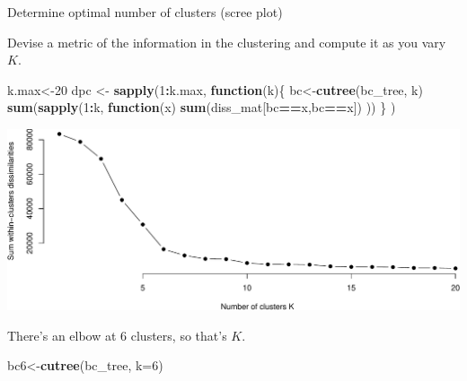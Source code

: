 \documentclass[
  ignorenonframetext,
]{beamer}
\newenvironment{Shaded}{\begin{snugshade}}{\end{snugshade}}
\newcommand{\ControlFlowTok}[1]{\textcolor[rgb]{0.13,0.29,0.53}{\textbf{#1}}}
\newcommand{\DataTypeTok}[1]{\textcolor[rgb]{0.13,0.29,0.53}{#1}}
\newcommand{\DecValTok}[1]{\textcolor[rgb]{0.00,0.00,0.81}{#1}}
\newcommand{\KeywordTok}[1]{\textcolor[rgb]{0.13,0.29,0.53}{\textbf{#1}}}
\newcommand{\NormalTok}[1]{#1}
\newcommand{\OperatorTok}[1]{\textcolor[rgb]{0.81,0.36,0.00}{\textbf{#1}}}
\newcommand{\StringTok}[1]{\textcolor[rgb]{0.31,0.60,0.02}{#1}}
\begin{document}
\begin{frame}[fragile]{Determine optimal number of clusters (scree
plot)}
\protect\hypertarget{determine-optimal-number-of-clusters-scree-plot}{}

Devise a metric of the information in the clustering and compute it as
you vary \(K\).

\scriptsize

\begin{Shaded}
\begin{Highlighting}[]
\NormalTok{k.max<-}\DecValTok{20}
\NormalTok{dpc <-}\StringTok{ }\KeywordTok{sapply}\NormalTok{(}\DecValTok{1}\OperatorTok{:}\NormalTok{k.max, }\ControlFlowTok{function}\NormalTok{(k)\{}
\NormalTok{    bc<-}\KeywordTok{cutree}\NormalTok{(bc_tree, k)}
    \KeywordTok{sum}\NormalTok{(}\KeywordTok{sapply}\NormalTok{(}\DecValTok{1}\OperatorTok{:}\NormalTok{k, }\ControlFlowTok{function}\NormalTok{(x) }\KeywordTok{sum}\NormalTok{(diss_mat[bc}\OperatorTok{==}\NormalTok{x,bc}\OperatorTok{==}\NormalTok{x]) )) }
\NormalTok{  \} )}
\end{Highlighting}
\end{Shaded}

\includegraphics{unsupervised_learning_files/figure-beamer/unnamed-chunk-12-1.pdf}
\normalsize

There's an elbow at 6 clusters, so that's \(K\). \scriptsize

\begin{Shaded}
\begin{Highlighting}[]
\NormalTok{bc6<-}\KeywordTok{cutree}\NormalTok{(bc_tree, }\DataTypeTok{k=}\DecValTok{6}\NormalTok{)}
\end{Highlighting}
\end{Shaded}

\end{frame}
\end{document}
